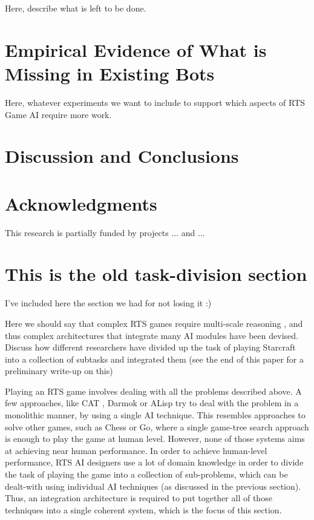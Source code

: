 \documentclass[journal]{IEEEtran}
\begin{document}
{\color{blue}
Here, describe what is left to be done.
}


\section{Empirical Evidence of What is Missing in Existing Bots}\label{sec:experiments}

{\color{blue}
Here, whatever experiments we want to include to support which aspects of RTS Game AI require more work.
}

\section{Discussion and Conclusions}\label{sec:conclusions}



\section*{Acknowledgments} {\color{blue} This research is partially funded by projects ... and ... }


\appendix

\section*{This is the old task-division section}

{\color{red}
I've included here the section we had for not losing it :)
}

{\color{blue}
Here we should say that complex RTS games require multi-scale reasoning \cite{WeberCig10}, and thus complex architectures that integrate many AI modules have been devised. Discuss how different researchers have divided up the task of playing Starcraft into a collection of subtasks and integrated them (see the end of this paper for a preliminary write-up on this)
}


Playing an RTS game involves dealing with all the problems described above. A few approaches, like CAT \cite{LTW}, Darmok \cite{OntanonMSR10} or ALisp \cite{Marthi05} try to deal with the problem in a monolithic manner, by using a single AI technique. This resembles approaches to solve other games, such as Chess or Go, where a single game-tree search approach is enough to play the game at human level. However, none of those systems aims at achieving near human performance. In order to achieve human-level performance, RTS AI designers use a lot of domain knowledge in order to divide the task of playing the game into a collection of sub-problems, which can be dealt-with using individual AI techniques (as discussed in the previous section). Thus, an integration architecture is required to put together all of those techniques into a single coherent system, which is the focus of this section.
\end{document}
